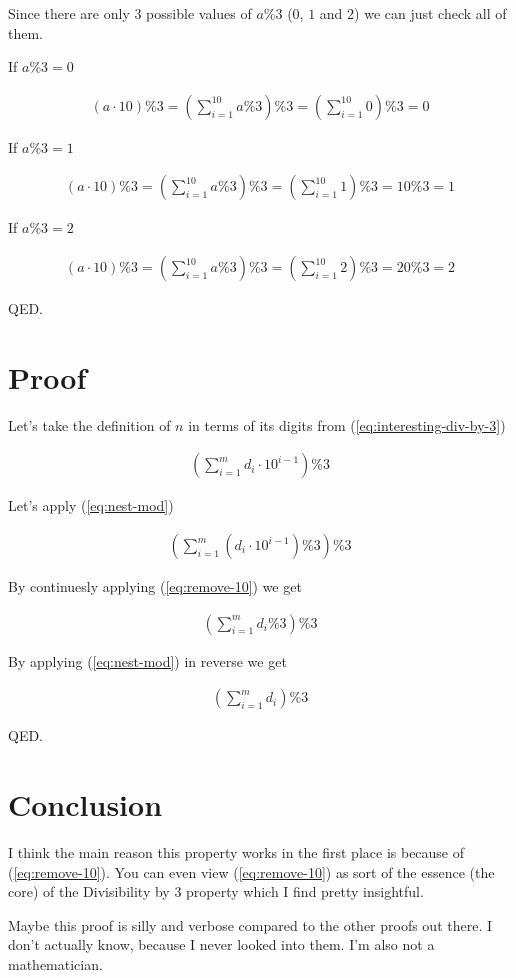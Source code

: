 \documentclass{article}
\begin{document}
Since there are only 3 possible values of $a\%3$ ($0$, $1$ and $2$) we can just check all of them.

If $a\%3 = 0$

\begin{align*}
    (a \cdot 10)\%3 = \left(\sum_{i=1}^{10}a\%3\right)\%3 = \left(\sum_{i=1}^{10}0\right)\%3 = 0
\end{align*}

If $a\%3 = 1$

\begin{align*}
    (a \cdot 10)\%3 = \left(\sum_{i=1}^{10}a\%3\right)\%3 = \left(\sum_{i=1}^{10}1\right)\%3 = 10\%3 = 1
\end{align*}

If $a\%3 = 2$

\begin{align*}
    (a \cdot 10)\%3 = \left(\sum_{i=1}^{10}a\%3\right)\%3 = \left(\sum_{i=1}^{10}2\right)\%3 = 20\%3 = 2
\end{align*}

QED.

\section{Proof}

Let's take the definition of $n$ in terms of its digits from
(\ref{eq:interesting-div-by-3})

\begin{align*}
  \left(\sum_{i=1}^{m}d_i\cdot 10^{i-1}\right)\%3
\end{align*}

Let's apply (\ref{eq:nest-mod})

\begin{align*}
  \left(\sum_{i=1}^{m}(d_i\cdot 10^{i-1})\%3\right)\%3
\end{align*}

By continuesly applying (\ref{eq:remove-10}) we get

\begin{align*}
  \left(\sum_{i=1}^{m}d_i\%3\right)\%3
\end{align*}

By applying (\ref{eq:nest-mod}) in reverse we get

\begin{align*}
  \left(\sum_{i=1}^{m}d_i\right)\%3
\end{align*}

QED.

\section{Conclusion}

I think the main reason this property works in the first place is
because of (\ref{eq:remove-10}). You can even view
(\ref{eq:remove-10}) as sort of the essence (the core) of the
Divisibility by 3 property which I find pretty insightful.

Maybe this proof is silly and verbose compared to the other proofs out
there. I don't actually know, because I never looked into them. I'm
also not a mathematician.
\end{document}
